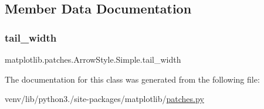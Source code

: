 \subsection{Member Data Documentation}
\mbox{\label{classmatplotlib_1_1patches_1_1ArrowStyle_1_1Simple_a25ca5219b32e3d8ad0aea3cdedc21115}} 
\subsubsection{\texorpdfstring{tail\+\_\+width}{tail\_width}}
{\footnotesize\ttfamily matplotlib.\+patches.\+Arrow\+Style.\+Simple.\+tail\+\_\+width}



The documentation for this class was generated from the following file\+:\begin{DoxyCompactItemize}
\item 
venv/lib/python3./site-\/packages/matplotlib/\hyperlink{patches_8py}{patches.\+py}\end{DoxyCompactItemize}
